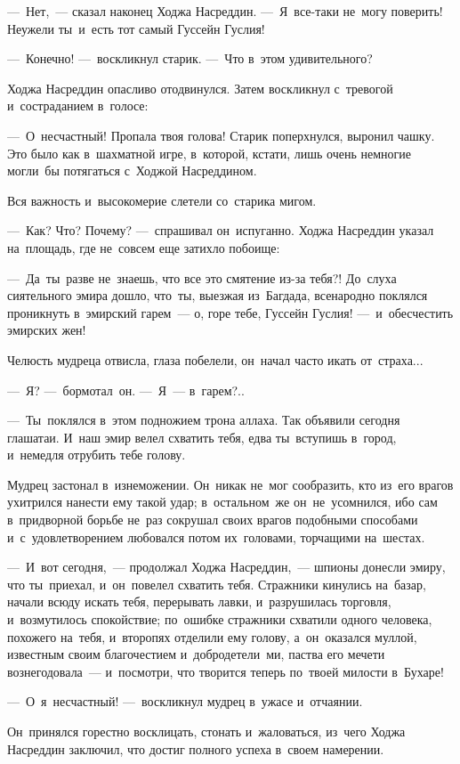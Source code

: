 \documentclass[12pt,a4paper]{book}
\begin{document}
—~Нет,~— сказал наконец Ходжа Насреддин. —~Я~все-таки не~могу поверить! Неужели ты~и~есть тот самый Гуссейн Гуслия!

—~Конечно! —~воскликнул старик. —~Что в~этом удивительного?

Ходжа Насреддин опасливо отодвинулся. Затем воскликнул с~тревогой и~состраданием в~голосе:

—~О~несчастный! Пропала твоя голова! Старик поперхнулся, выронил чашку. Это было как в~шахматной игре, в~которой, кстати, лишь очень немногие могли~бы потягаться с~Ходжой Насреддином.

Вся важность и~высокомерие слетели со~старика мигом.

—~Как? Что? Почему? —~спрашивал он~испуганно. Ходжа Насреддин указал на~площадь, где не~совсем еще затихло побоище:

—~Да~ты~разве не~знаешь, что все это смятение из-за тебя?! До~слуха сиятельного эмира дошло, что~ты, выезжая из~Багдада, всенародно поклялся проникнуть в~эмирский гарем~— о, горе тебе, Гуссейн Гуслия! —~и~обесчестить эмирских жен!

Челюсть мудреца отвисла, глаза побелели, он~начал часто икать от~страха...

—~Я? —~бормотал~он. —~Я~— в~гарем?..

—~Ты~поклялся в~этом подножием трона аллаха. Так объявили сегодня глашатаи. И~наш эмир велел схватить тебя, едва ты~вступишь в~город, и~немедля отрубить тебе голову.

Мудрец застонал в~изнеможении. Он~никак не~мог сообразить, кто из~его врагов ухитрился нанести ему такой удар; в~остальном~же он~не~усомнился, ибо сам в~придворной борьбе не~раз сокрушал своих врагов подобными способами и~с~удовлетворением любовался потом их~головами, торчащими на~шестах.

—~И~вот сегодня,~— продолжал Ходжа Насреддин,~— шпионы донесли эмиру, что ты~приехал, и~он~повелел схватить тебя. Стражники кинулись на~базар, начали всюду искать тебя, перерывать лавки, и~разрушилась торговля, и~возмутилось спокойствие; по~ошибке стражники схватили одного человека, похожего на~тебя, и~второпях отделили ему голову, а~он~оказался муллой, известным своим благочестием и~добродетели~ми, паства его мечети вознегодовала~— и~посмотри, что творится теперь по~твоей милости в~Бухаре!

—~О~я~несчастный! —~воскликнул мудрец в~ужасе и~отчаянии.

Он~принялся горестно восклицать, стонать и~жаловаться, из~чего Ходжа Насреддин заключил, что достиг полного успеха в~своем намерении.
\end{document}
